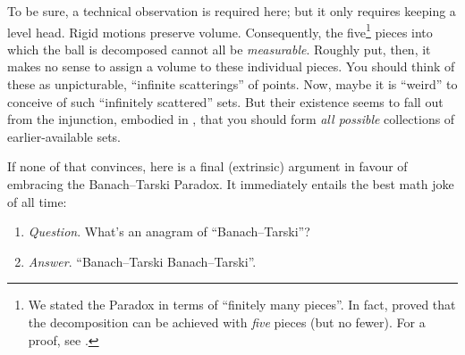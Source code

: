 \documentclass[../../../include/open-logic-section]{subfiles}
\begin{document}
To be sure, a technical observation is required here; but it only
requires keeping a level head. Rigid motions preserve volume.
Consequently, the five\footnote{We stated the Paradox in terms of
``finitely many pieces''. In fact, \cite{Robinson1947} proved that
the decomposition can be achieved with \emph{five} pieces
(but no fewer). For a proof, see \cite[pp.~66--7]{Wagon2016}.} pieces
into which the ball is decomposed cannot all be \emph{measurable}.
Roughly put, then, it makes no sense to assign a volume to these
individual pieces. You should think of these as unpicturable,
``infinite scatterings'' of points. Now, maybe it is ``weird'' to
conceive of such ``infinitely scattered'' sets. But their existence
seems to fall out from the injunction, embodied in \stagesacc{}, that
you should form \emph{all possible} collections of earlier-available
sets. 

If none of that convinces, here is a final (extrinsic) argument in
favour of embracing the Banach--Tarski Paradox. It immediately entails
the best math joke of all time:
\begin{enumerate}
	\item[] \emph{Question}. What's an anagram of ``Banach--Tarski''? 
	\item[] \emph{Answer}. ``Banach--Tarski Banach--Tarski''.
\end{enumerate}
\end{document}
